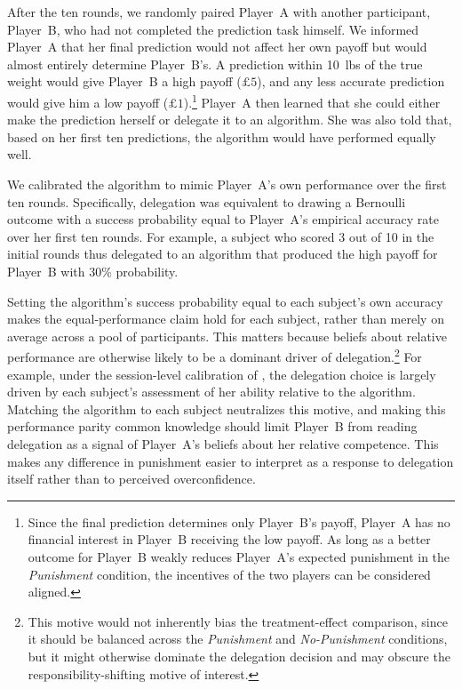 After the ten rounds, we randomly paired Player~A with another participant, Player~B, who had not completed the prediction task himself. We informed Player~A that her final prediction would not affect her own payoff but would almost entirely determine Player~B's. A prediction within 10~lbs of the true weight would give Player~B a high payoff ($\pounds 5$), and any less accurate prediction would give him a low payoff ($\pounds 1$).\footnote{Since the final prediction determines only Player~B's payoff, Player~A has no financial interest in Player~B receiving the low payoff. As long as a better outcome for Player~B weakly reduces Player~A's expected punishment in the \textit{Punishment} condition, the incentives of the two players can be considered aligned.} Player~A then learned that she could either make the prediction herself or delegate it to an algorithm. She was also told that, based on her first ten predictions, the algorithm would have performed equally well.

We calibrated the algorithm to mimic Player~A's own performance over the first ten rounds. Specifically, delegation was equivalent to drawing a Bernoulli outcome with a success probability equal to Player~A's empirical accuracy rate over her first ten rounds. For example, a subject who scored 3 out of 10 in the initial rounds thus delegated to an algorithm that produced the high payoff for Player~B with $30\%$ probability.

Setting the algorithm's success probability equal to each subject's own accuracy makes the equal-performance claim hold for each subject, rather than merely on average across a pool of participants. This matters because beliefs about relative performance are otherwise likely to be a dominant driver of delegation.\footnote{This motive would not inherently bias the treatment-effect comparison, since it should be balanced across the \textit{Punishment} and \textit{No-Punishment} conditions, but it might otherwise dominate the delegation decision and may obscure the responsibility-shifting motive of interest.} For example, under the session-level calibration of \citet{feier_hiding_2022}, the delegation choice is largely driven by each subject's assessment of her ability relative to the algorithm. Matching the algorithm to each subject neutralizes this motive, and making this performance parity common knowledge should limit Player~B from reading delegation as a signal of Player~A's beliefs about her relative competence. This makes any difference in punishment easier to interpret as a response to delegation itself rather than to perceived overconfidence.

